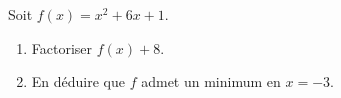 
\begin{exercice}\label{exosmath-0051}

Soit \( f(x)=x^2+6x+1\).
\begin{enumerate}
    \item
        Factoriser \( f(x)+8\).
    \item
        En déduire que \( f\) admet un minimum en \( x=-3\).
\end{enumerate}

\end{exercice}
